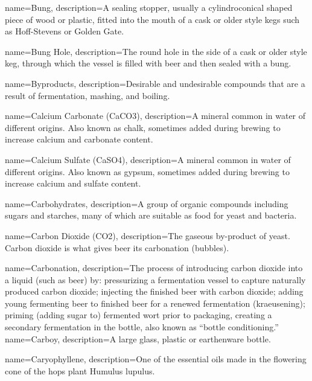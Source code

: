 {
  name={Bung},
  description={A sealing stopper, usually a cylindroconical shaped piece of wood or plastic, fitted into the mouth of a cask or older style kegs such as Hoff-Stevens or Golden Gate.}
  }

{
  name={Bung Hole},
  description={The round hole in the side of a cask or older style keg, through which the vessel is filled with beer and then sealed with a bung.}
  }

{
  name={Byproducts},
  description={Desirable and undesirable compounds that are a result of fermentation, mashing, and boiling.}
  }

{
  name={Calcium Carbonate (CaCO3)},
  description={A mineral common in water of different origins. Also known as chalk, sometimes added during brewing to increase calcium and carbonate content.}
  }

{
  name={Calcium Sulfate (CaSO4)},
  description={A mineral common in water of different origins. Also known as gypsum, sometimes added during brewing to increase calcium and sulfate content.}
  }

{
  name={Carbohydrates},
  description={A group of organic compounds including sugars and starches, many of which are suitable as food for yeast and bacteria.}
  }

{
  name={Carbon Dioxide (CO2)},
  description={The gaseous by-product of yeast. Carbon dioxide is what gives beer its carbonation (bubbles).}
  }

{
  name={Carbonation},
  description={The process of introducing carbon dioxide into a liquid (such as beer) by: pressurizing a fermentation vessel to capture naturally produced carbon dioxide; injecting the finished beer with carbon dioxide; adding young fermenting beer to finished beer for a renewed fermentation (kraeusening); priming (adding sugar to) fermented wort prior to packaging, creating a secondary fermentation in the bottle, also known as ``bottle conditioning.''}
  }
{
  name={Carboy},
  description={A large glass, plastic or earthenware bottle.}
  }

{
  name={Caryophyllene},
  description={One of the essential oils made in the flowering cone of the hops plant Humulus lupulus.}
  }

